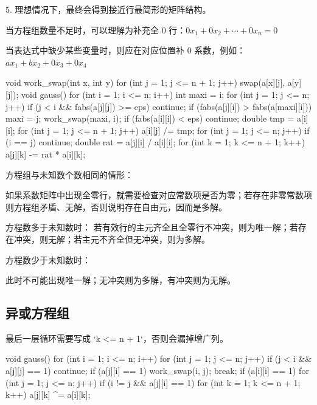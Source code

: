 \documentclass[UTF8,a4paper,11pt]{ctexart}
\newcommand{\topic}[1]{%
  \par\needspace{3\baselineskip}\vspace{0.45em}%
  \noindent{\bfseries\color{Primary}#1}\par\vspace{0.12em}%
}
\begin{document}
5. 理想情况下，最终会得到接近行最简形的矩阵结构。

当方程组数量不足时，可以理解为补充全 $0$ 行：$0x_1+0x_2+\cdots+0x_n = 0$

当表达式中缺少某些变量时，则应在对应位置补 $0$ 系数，例如：$ax_1+bx_2+0x_3+0x_4$

\begin{CodeBlock}
void work_swap(int x, int y) {
    for (int j = 1; j <= n + 1; j++)
        swap(a[x][j], a[y][j]);
}
void gauss() {
    for (int i = 1; i <= n; i++) {
        int maxi = i;
        for (int j = 1; j <= n; j++) {
            if (j < i && fabs(a[j][j]) >= eps)
                continue;
            if (fabs(a[j][i]) > fabs(a[maxi][i]))
                maxi = j;
        }
        work_swap(maxi, i);
        if (fabs(a[i][i]) < eps)
            continue;
        double tmp = a[i][i];
        for (int j = 1; j <= n + 1; j++)
            a[i][j] /= tmp;
        for (int j = 1; j <= n; j++) {
            if (i == j)
                continue;
            double rat = a[j][i] / a[i][i];
            for (int k = 1; k <= n + 1; k++)
                a[j][k] -= rat * a[i][k];
        }
    }
}
\end{CodeBlock}

\topic{解的判定}

方程组与未知数个数相同的情形：

如果系数矩阵中出现全零行，就需要检查对应常数项是否为零；若存在非零常数项则方程组矛盾、无解，否则说明存在自由元，因而是多解。

方程数多于未知数时：
若有效行的主元齐全且全零行不冲突，则为唯一解；若存在冲突，则无解；若主元不齐全但无冲突，则为多解。

方程数少于未知数时：

此时不可能出现唯一解；无冲突则为多解，有冲突则为无解。

\subsection{异或方程组}

最后一层循环需要写成 `k <= n + 1`，否则会漏掉增广列。

\begin{CodeBlock}
void gauss() {
    for (int i = 1; i <= n; i++) {
        for (int j = 1; j <= n; j++) {
            if (j < i && a[j][j] == 1)
                continue;
            if (a[j][i] == 1) {
                work_swap(i, j);
                break;
            }
        }
        if (a[i][i] == 1) {
            for (int j = 1; j <= n; j++) {
                if (i != j && a[j][i] == 1) {
                    for (int k = 1; k <= n + 1; k++)
                        a[j][k] ^= a[i][k];
                }
            }
        }
    }
}
\end{CodeBlock}
\end{document}
